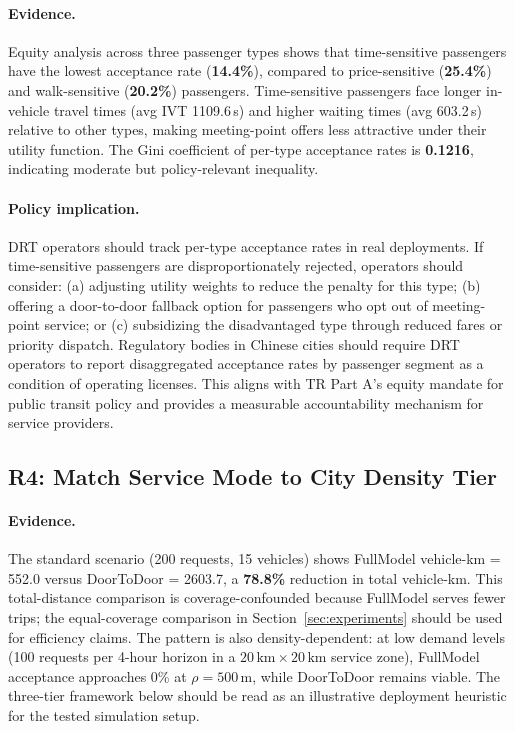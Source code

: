 \paragraph{Evidence.}
Equity analysis across three passenger types shows that time-sensitive
passengers have the lowest acceptance rate (\textbf{14.4\%}), compared to
price-sensitive (\textbf{25.4\%}) and walk-sensitive (\textbf{20.2\%})
passengers. Time-sensitive passengers face longer in-vehicle travel times
(avg IVT 1109.6\,s) and higher waiting times (avg 603.2\,s) relative to
other types, making meeting-point offers less attractive under their utility
function. The Gini coefficient of per-type acceptance rates is
\textbf{0.1216}, indicating moderate but policy-relevant inequality.

\paragraph{Policy implication.}
DRT operators should track per-type acceptance rates in real deployments.
If time-sensitive passengers are disproportionately rejected, operators
should consider: (a) adjusting utility weights to reduce the penalty
for this type; (b) offering a door-to-door fallback option for passengers
who opt out of meeting-point service; or (c) subsidizing the disadvantaged
type through reduced fares or priority dispatch. Regulatory bodies in
Chinese cities should require DRT operators to report disaggregated
acceptance rates by passenger segment as a condition of operating licenses.
This aligns with TR Part A's equity mandate for public transit policy and
provides a measurable accountability mechanism for service providers.

\subsection{R4: Match Service Mode to City Density Tier}

\paragraph{Evidence.}
The standard scenario (200 requests, 15 vehicles) shows FullModel
vehicle-km = 552.0 versus DoorToDoor = 2603.7, a \textbf{78.8\%} reduction
in total vehicle-km. This total-distance comparison is coverage-confounded
because FullModel serves fewer trips; the equal-coverage comparison in
Section~\ref{sec:experiments} should be used for efficiency claims. The
pattern is also density-dependent: at low demand levels
(100 requests per 4-hour horizon in a $20\,\text{km} \times 20\,\text{km}$
service zone), FullModel acceptance approaches 0\% at $\rho = 500$\,m,
while DoorToDoor remains viable. The three-tier framework below should be
read as an illustrative deployment heuristic for the tested simulation setup.

